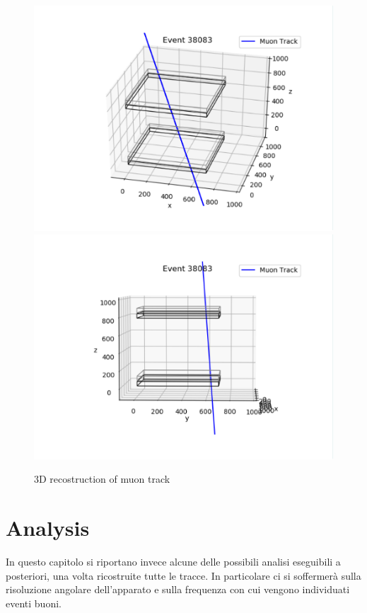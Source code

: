 \documentclass[a4paper,11pt]{book}
\begin{document}
\begin{figure}[hbtp]
\centering
\includegraphics[scale=0.5]{pictures/Track_3D.pdf}
\includegraphics[scale=0.5]{pictures/Track_3D_2.pdf}
\caption{3D recostruction of muon track}
\label{fig:3D_track}
\end{figure}




\chapter{Analysis}

In questo capitolo si riportano invece alcune delle possibili analisi eseguibili a posteriori, una volta ricostruite tutte le tracce. In particolare ci si soffermerà sulla risoluzione angolare dell'apparato e sulla frequenza con cui vengono individuati eventi buoni.\\
\end{document}

